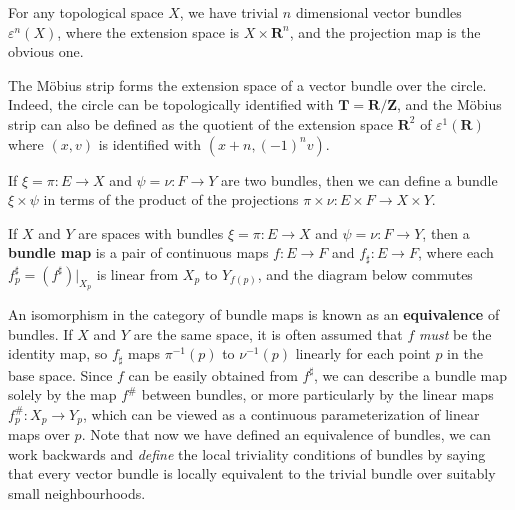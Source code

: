 \begin{example}
    For any topological space $X$, we have trivial $n$ dimensional vector bundles $\varepsilon^n(X)$, where the extension space is $X \times \mathbf{R}^n$, and the projection map is the obvious one.
\end{example}

\begin{example}
    The M\"{o}bius strip forms the extension space of a vector bundle over the circle. Indeed, the circle can be topologically identified with $\mathbf{T} = \mathbf{R}/\mathbf{Z}$, and the M\"{o}bius strip can also be defined as the quotient of the extension space $\mathbf{R}^2$ of $\varepsilon^1(\mathbf{R})$ where $(x,v)$ is identified with $(x + n, (-1)^n v)$.
\end{example}

\begin{example}
    If $\xi = \pi: E \to X$ and $\psi = \nu: F \to Y$ are two bundles, then we can define a bundle $\xi \times \psi$ in terms of the product of the projections $\pi \times \nu: E \times F \to X \times Y$.
\end{example}

If $X$ and $Y$ are spaces with bundles $\xi = \pi: E \to X$ and $\psi = \nu: F \to Y$, then a {\bf bundle map} is a pair of continuous maps $f: E \to F$ and $f_\sharp: E \to F$, where each $f^\sharp_p = (f^\sharp)|_{X_p}$ is linear from $X_p$ to $Y_{f(p)}$, and the diagram below commutes
%
\begin{center}
\end{center}
%
An isomorphism in the category of bundle maps is known as an {\bf equivalence} of bundles. If $X$ and $Y$ are the same space, it is often assumed that $f$ {\it must} be the identity map, so $f_\sharp$ maps $\pi^{-1}(p)$ to $\nu^{-1}(p)$ linearly for each point $p$ in the base space. Since $f$ can be easily obtained from $f^\sharp$, we can describe a bundle map solely by the map $f^\#$ between bundles, or more particularly by the linear maps $f^\#_p: X_p \to Y_p$, which can be viewed as a continuous parameterization of linear maps over $p$. Note that now we have defined an equivalence of bundles, we can work backwards and {\it define} the local triviality conditions of bundles by saying that every vector bundle is locally equivalent to the trivial bundle over suitably small neighbourhoods.

